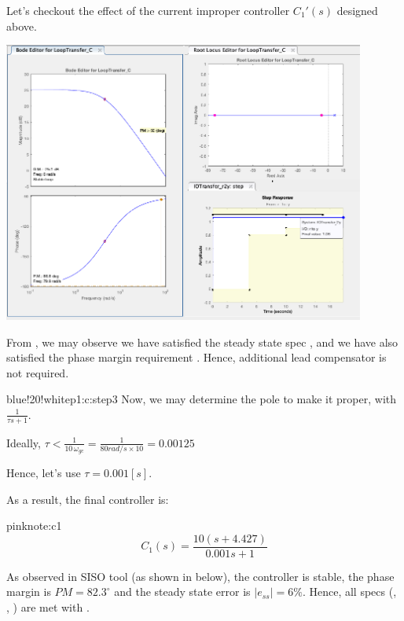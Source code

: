 \documentclass{tron}
\begin{document}
	Let's checkout the effect of the current improper controller $C_1'(s)$ designed above. 
	
	{	
		\centering
		\includegraphics[width=450px]{Fig/sisotool-c1-zero.png}
    }
	
	From , we may observe we have satisfied the steady state spec , and we have also satisfied the phase margin requirement . Hence, additional lead compensator is not required. 
	
	\begin{note}{blue!20!white}{p1:c:step3}
		Now, we may determine the pole to make it proper, with $\frac{1}{\tau s + 1}$. 
		
		Ideally, $\tau < \frac{1}{10\, \omega_{gc}} = \frac1{80 \unit{rad/s} \times 10} = 0.00125$ 
		
		Hence, let's use $\tau = 0.001 [s]$.
	\end{note}
	
	As a result, the final controller is:
	
	\begin{note}{pink}{note:c1}
		\begin{equation}
			C_1(s) = \frac{10 (s + 4.427)}{0.001 s + 1} \label{eqn:c1}
		\end{equation}		
	\end{note}

	As observed in SISO tool (as shown in  below), the controller is stable, the phase margin is $PM=82.3^\circ$ and the steady state error is $|e_{ss}| = 6\%$. Hence, all specs (, , ) are met with .
	
\end{document}
